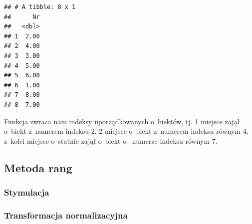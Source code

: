 \documentclass[12pt,a4paper]{report}
\begin{document}
{\begin{Shaded}
\begin{Highlighting}[]
\end{Highlighting}
\end{Shaded}
\begin{verbatim}
## # A tibble: 8 x 1
##      Nr
##   <dbl>
## 1  2.00
## 2  4.00
## 3  3.00
## 4  5.00
## 5  6.00
## 6  1.00
## 7  8.00
## 8  7.00
\end{verbatim}
Funkcja zwraca nam indeksy uporządkowanych o~biektów, tj. 1 miejsce
zajął o~biekt z~numerem indeksu 2, 2 miejsce o~biekt z~numerem indeksu
równym 4, z~kolei miejsce o~statnie zajął o~biekt o~ numerze indeksu równym
7.
\subsection{Metoda rang}
\subsubsection{Stymulacja} 
\begin{Shaded}
\begin{Highlighting}[]
\NormalTok{)} 
\end{Highlighting}
\end{Shaded}
\subsubsection{Transformacja normalizacyjna}
\begin{Shaded}
\begin{Highlighting}[]
\end{Highlighting}
\end{Shaded}
}
\end{document}
